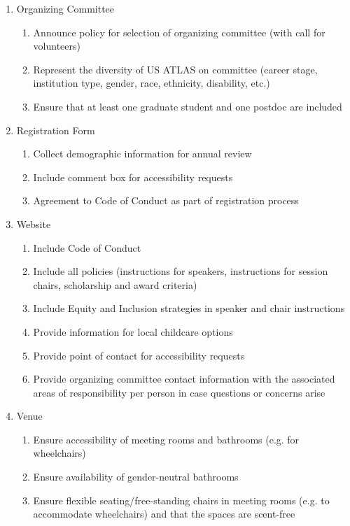 \documentclass{article}
\begin{document}
  \begin{enumerate}
    \item Organizing Committee
    \begin{enumerate}[label=\alph*.]
      \item Announce policy for selection of organizing committee (with call for volunteers)
      \item Represent the diversity of US ATLAS on committee (career stage, institution type, gender, race, ethnicity, disability, etc.)
      \item Ensure that at least one graduate student and one postdoc are included
    \end{enumerate}
    \item Registration Form
    \begin{enumerate}[label=\alph*.]
      \item Collect demographic information for annual review
      \item Include comment box for accessibility requests
      \item Agreement to Code of Conduct as part of registration process
    \end{enumerate}
    \item Website
    \begin{enumerate}[label=\alph*.]
      \item Include Code of Conduct~\cite{CERNCoC}
      \item Include all policies (instructions for speakers, instructions for session chairs, scholarship and award criteria)
      \item Include Equity and Inclusion strategies in speaker and chair instructions
      \item Provide information for local childcare options
      \item Provide point of contact for accessibility requests
      \item Provide organizing committee contact information with the associated areas of responsibility per person in case questions or concerns arise
    \end{enumerate}
    \item Venue
    \begin{enumerate}[label=\alph*.]
      \item Ensure accessibility of meeting rooms and bathrooms (e.g. for wheelchairs)
      \item Ensure availability of gender-neutral bathrooms
      \item Ensure flexible seating/free-standing chairs in meeting rooms (e.g. to accommodate wheelchairs) and that the spaces are scent-free

\end{enumerate}
\end{enumerate}
\end{document}
